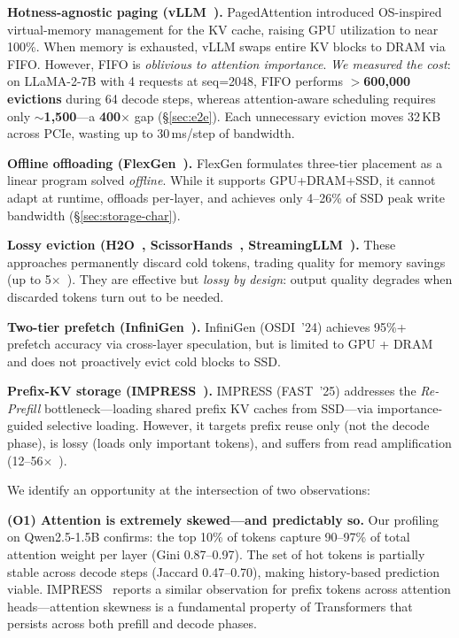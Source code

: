 \documentclass[conference]{IEEEtran}
\begin{document}
\textbf{Hotness-agnostic paging (vLLM~\cite{vllm}).} PagedAttention introduced OS-inspired virtual-memory management for the KV cache, raising GPU utilization to near 100\%. When memory is exhausted, vLLM swaps entire KV blocks to DRAM via FIFO. However, FIFO is \emph{oblivious to attention importance}. \emph{We measured the cost}: on LLaMA-2-7B with 4 requests at seq=2048, FIFO performs \textbf{$>$600{,}000 evictions} during 64 decode steps, whereas attention-aware scheduling requires only \textbf{$\sim$1{,}500}---a \textbf{400$\times$} gap (\S\ref{sec:e2e}). Each unnecessary eviction moves 32\,KB across PCIe, wasting up to 30\,ms/step of bandwidth.

\textbf{Offline offloading (FlexGen~\cite{flexgen}).} FlexGen formulates three-tier placement as a linear program solved \emph{offline}. While it supports GPU+DRAM+SSD, it cannot adapt at runtime, offloads per-layer, and achieves only 4--26\% of SSD peak write bandwidth (\S\ref{sec:storage-char}).

\textbf{Lossy eviction (H2O~\cite{h2o}, ScissorHands~\cite{scissorhands}, StreamingLLM~\cite{streamingllm}).} These approaches permanently discard cold tokens, trading quality for memory savings (up to 5$\times$~\cite{h2o}).  They are effective but \emph{lossy by design}: output quality degrades when discarded tokens turn out to be needed.

\textbf{Two-tier prefetch (InfiniGen~\cite{infinigen}).} InfiniGen (OSDI~'24) achieves 95\%+ prefetch accuracy via cross-layer speculation, but is limited to GPU + DRAM and does not proactively evict cold blocks to SSD.

\textbf{Prefix-KV storage (IMPRESS~\cite{impress}).} IMPRESS (FAST~'25) addresses the \emph{Re-Prefill} bottleneck---loading shared prefix KV caches from SSD---via importance-guided selective loading. However, it targets prefix reuse only (not the decode phase), is lossy (loads only important tokens), and suffers from read amplification (12--56$\times$~\cite{impress}).

We identify an opportunity at the intersection of two observations:

\textbf{(O1) Attention is extremely skewed---and predictably so.} Our profiling on Qwen2.5-1.5B confirms: the top 10\% of tokens capture 90--97\% of total attention weight per layer (Gini 0.87--0.97). The set of hot tokens is partially stable across decode steps (Jaccard 0.47--0.70), making history-based prediction viable. IMPRESS~\cite{impress} reports a similar observation for prefix tokens across attention heads---attention skewness is a fundamental property of Transformers that persists across both prefill and decode phases.
\end{document}
